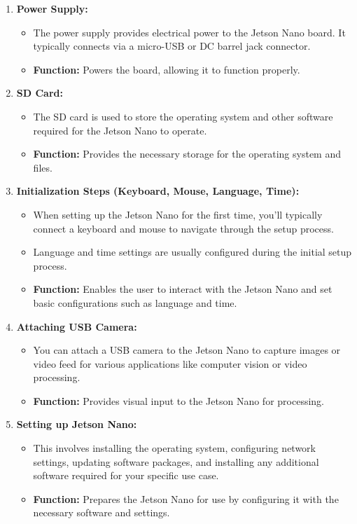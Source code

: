 \begin{enumerate}[label=\textbf{\arabic*.}]
	\item \textbf{Power Supply:}
	\begin{itemize}
		\item The power supply provides electrical power to the Jetson Nano board. It typically connects via a micro-USB or DC barrel jack connector.
		\item \textbf{Function:} Powers the board, allowing it to function properly.
	\end{itemize}
	
	\item \textbf{SD Card:}
	\begin{itemize}
		\item The SD card is used to store the operating system and other software required for the Jetson Nano to operate.
		\item \textbf{Function:} Provides the necessary storage for the operating system and files.
	\end{itemize}
	
	\item \textbf{Initialization Steps (Keyboard, Mouse, Language, Time):}
	\begin{itemize}
		\item When setting up the Jetson Nano for the first time, you'll typically connect a keyboard and mouse to navigate through the setup process.
		\item Language and time settings are usually configured during the initial setup process.
		\item \textbf{Function:} Enables the user to interact with the Jetson Nano and set basic configurations such as language and time.
	\end{itemize}
	
	\item \textbf{Attaching USB Camera:}
	\begin{itemize}
		\item You can attach a USB camera to the Jetson Nano to capture images or video feed for various applications like computer vision or video processing.
		\item \textbf{Function:} Provides visual input to the Jetson Nano for processing.
	\end{itemize}
	
	\item \textbf{Setting up Jetson Nano:}
	\begin{itemize}
		\item This involves installing the operating system, configuring network settings, updating software packages, and installing any additional software required for your specific use case.
		\item \textbf{Function:} Prepares the Jetson Nano for use by configuring it with the necessary software and settings.
	\end{itemize}
	

\end{enumerate}
